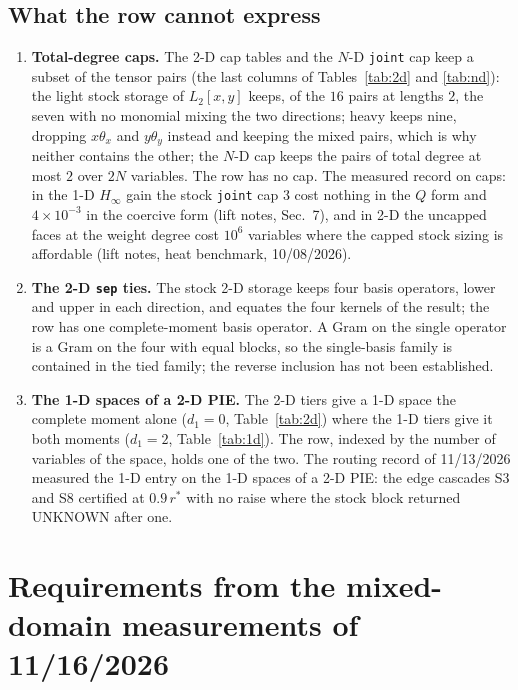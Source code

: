 \documentclass[12pt]{article}
\newcommand{\code}[1]{\texttt{#1}}
\theoremstyle{plain}
\theoremstyle{definition}
\theoremstyle{remark}
\begin{document}
\subsection{What the row cannot express}\label{sec:cannot}

\begin{enumerate}\setlength\itemsep{0pt}
\item \textbf{Total-degree caps.} The 2-D cap tables and the $N$-D \code{joint} cap keep a subset of the tensor pairs (the last columns of Tables~\ref{tab:2d} and \ref{tab:nd}): the light stock storage of $L_2[x,y]$ keeps, of the $16$ pairs at lengths $2$, the seven with no monomial mixing the two directions; heavy keeps nine, dropping $x\theta_x$ and $y\theta_y$ instead and keeping the mixed pairs, which is why neither contains the other; the $N$-D cap keeps the pairs of total degree at most $2$ over $2N$ variables. The row has no cap. The measured record on caps: in the 1-D $H_\infty$ gain the stock \code{joint} cap $3$ cost nothing in the $Q$ form and $4\times10^{-3}$ in the coercive form (lift notes, Sec.~7), and in 2-D the uncapped faces at the weight degree cost $10^6$ variables where the capped stock sizing is affordable (lift notes, heat benchmark, 10/08/2026).
\item \textbf{The 2-D \code{sep} ties.} The stock 2-D storage keeps four basis operators, lower and upper in each direction, and equates the four kernels of the result; the row has one complete-moment basis operator. A Gram on the single operator is a Gram on the four with equal blocks, so the single-basis family is contained in the tied family; the reverse inclusion has not been established.
\item \textbf{The 1-D spaces of a 2-D PIE.} The 2-D tiers give a 1-D space the complete moment alone ($d_1=0$, Table~\ref{tab:2d}) where the 1-D tiers give it both moments ($d_1=2$, Table~\ref{tab:1d}). The row, indexed by the number of variables of the space, holds one of the two. The routing record of 11/13/2026 measured the 1-D entry on the 1-D spaces of a 2-D PIE: the edge cascades S3 and S8 certified at $0.9\,r^*$ with no raise where the stock block returned UNKNOWN after one.
\end{enumerate}

\section{Requirements from the mixed-domain measurements of 11/16/2026}\label{sec:mixed}
\end{document}
